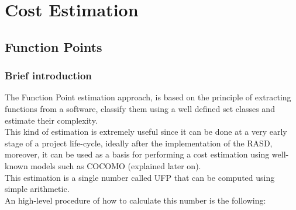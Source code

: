 \newpage
\def\arraystretch{1.15}
\section{Cost Estimation}
\subsection{Function Points}
\subsubsection{Brief introduction}
The Function Point estimation approach, is based on the principle of extracting functions from a software, classify them using a well defined set classes and estimate their complexity. \\ This kind of estimation is extremely useful since it can be done at a very early stage of a project life-cycle, ideally after the implementation of the RASD, moreover, it can be used as a basis for performing a cost estimation using well-known models such as COCOMO (explained later on). \\
This estimation is a single number called UFP that can be computed using simple arithmetic. \\
An high-level procedure of how to calculate this number is the following:
